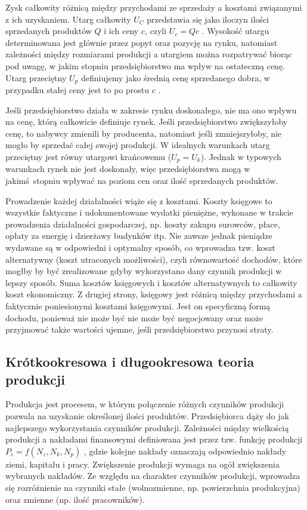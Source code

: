 \documentclass[12pt]{extarticle}
\begin{document}
Zysk całkowity różnicą między przychodami ze sprzedaży a kosztami związanymi z ich uzyskaniem. Utarg całkowity $ U_C $ przedstawia się jako iloczyn ilości sprzedanych produktów $ Q $ i ich ceny $ c $, czyli $ U_c = Qc $ . Wysokość utargu determinowana jest głównie przez popyt oraz pozycję na rynku, natomiast zależności między rozmiarami produkcji a utargiem można rozpatrywać biorąc pod uwagę, w jakim stopniu przedsiębiorstwo ma wpływ na ostateczną cenę. Utarg przeciętny $ U_p $ definiujemy jako średnią cenę sprzedanego dobra, w przypadku stałej ceny jest to po prostu $ c $ .

Jeśli przedsiębiorstwo działa w zakresie rynku doskonałego, nie ma ono wpływu na cenę, którą całkowicie definiuje rynek. Jeśli przedsiębiorstwo zwiększyłoby cenę, to nabywcy zmienili by producenta, natomiast jeśli zmniejszyłoby, nie mogło by sprzedać całej swojej produkcji. W idealnych warunkach utarg przeciętny jest równy utargowi krańcowemu ($ U_p = U_k $). Jednak w typowych warunkach rynek nie jest doskonały, więc przedsiębiorstwa mogą w jakimś stopniu wpływać na poziom cen oraz ilość sprzedanych produktów.

Prowadzenie każdej działalności wiąże się z kosztami. Koszty księgowe to wszystkie faktyczne i udokumentowane wydatki pieniężne, wykonane w trakcie prowadzenia działalności gospodarczej, np. koszty zakupu surowców, płace, opłaty za energię i dzierżawy budynków itp. Nie zawsze jednak pieniądze wydawane są w odpowiedni i optymalny sposób, co wprowadza tzw. koszt alternatywny (koszt utraconych możliwości), czyli równowartość dochodów, które mogłby by być zrealizowane gdyby wykorzystano dany czynnik produkcji w lepszy sposób. Suma kosztów księgowych i kosztów alternatywnych to całkowity koszt ekonomiczny. Z drugiej strony, księgowy jest różnicą między przychodami a faktycznie poniesionymi kosztami księgowymi. Jest on specyficzną formą dochodu, ponieważ nie może być nie może być negocjowany oraz może przyjmować także wartości ujemne, jeśli przedsiębiorstwo przynosi straty.

\subsection{Krótkookresowa i długookresowa teoria produkcji}

Produkcja jest procesem, w którym połączenie różnych czynników produkcji pozwala na uzyskanie określonej ilości produktów. Przedsiębiorca dąży do jak najlepszego wykorzystania czynników produkcji. Zależności między wielkością produkcji a nakładami finansowymi definiowana jest przez tzw. funkcję produkcji $ P_c = f(N_z, N_k, N_p) $ , gdzie kolejne nakłady oznaczają odpowiednio nakłady ziemi, kapitału i pracy. Zwiększenie produkcji wymaga na ogół zwiększenia wybranych nakładów. Ze względu na charakter czynników produkcji, wprowadza się rozróżnienie na czynniki stałe (wolnozmienne, np. powierzchnia produkcyjna) oraz zmienne (np. ilość pracowników).
\end{document}
